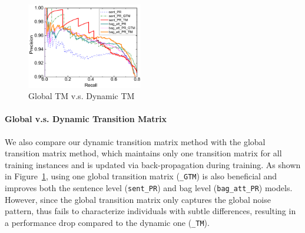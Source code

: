 \begin{figure}[htbp]
\setlength{\belowcaptionskip}{-10pt}
\begin{center}
\includegraphics[width=0.45\textwidth]{figures/single_cmp_exp_overall.pdf}
\caption{Global TM v.s. Dynamic TM}
\label{fig: cmp_single_dynamic}
\end{center}
\end{figure}

\paragraph{Global v.s. Dynamic Transition Matrix}
We also compare our dynamic transition matrix method with the global transition matrix method, 
which maintains only one transition matrix for all training instances %
and is updated via back-propagation during training. 
As shown in Figure~\ref{fig: cmp_single_dynamic}, 
using  one global transition matrix (\texttt{\_GTM}) is also beneficial and improves both the sentence level (\texttt{sent\_PR}) and bag level  (\texttt{bag\_att\_PR}) models. However, since the global transition matrix only 
captures the global noise pattern, thus fails to characterize individuals with subtle differences, 
resulting in a performance drop compared to the dynamic one (\texttt{\_TM}).

